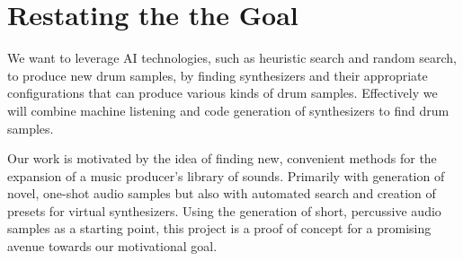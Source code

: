 \documentclass[\main/thesis.tex]{subfiles}
\begin{document}
\section{Restating the the Goal}
We want to leverage AI technologies, such as heuristic search and random search, to produce new drum samples, by finding synthesizers and their appropriate configurations that can produce various kinds of drum samples. Effectively we will combine machine listening and code generation of synthesizers to find drum samples.

Our work is motivated by the idea of finding new, convenient methods for the expansion of a music producer's library of sounds. Primarily with generation of novel, one-shot audio samples but also with automated search and creation of presets for virtual synthesizers. Using the generation of short, percussive audio samples as a starting point, this project is a proof of concept for a promising avenue towards our motivational goal.
\end{document}
